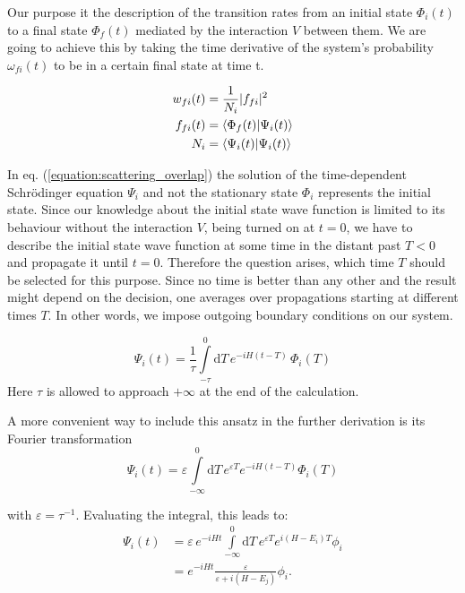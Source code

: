 Our purpose it the description of the transition rates from an initial state
$\Phi_i(t)$ to a final state $\Phi_f(t)$ mediated by the interaction $V$ between
them. We are going to achieve this by taking the time derivative of the system's
probability $\omega_{fi}(t)$ to be in a certain final state at time t.

\begin{align}
  w_{fi}(t) &= \frac 1{N_i} |f_{fi}|^2 \\
  f_{fi}(t) &= \braket{\Phi_f(t)|\Psi_i(t)} \label{equation:scattering_overlap}\\
  N_i       &= \braket{\Psi_i(t)|\Psi_i(t)}
\end{align}

In eq. (\ref{equation:scattering_overlap}) the solution of the time-dependent 
Schrödinger equation $\Psi_i$ and not the stationary state $\Phi_i$
represents the initial state. Since our knowledge
about the initial state wave function is limited to its behaviour without the
interaction $V$, being turned on at $t=0$, we have to describe the initial state
wave function at some time in the distant past $T<0$ and propagate it until $t=0$.
Therefore the question arises, which time $T$ should be selected for this purpose.
Since no time is better than any other and the result might depend on the decision,
one averages over propagations starting at different times $T$. In other words,
we impose outgoing boundary conditions on our system.

\begin{equation}
  \Psi_i(t) = \frac 1\tau \int\limits_{-\tau}^0 \mathrm{d}T \,
              e^{-iH(t-T)} \, \Phi_i(T)
\end{equation}
Here $\tau$ is allowed to approach $+\infty$ at the end of the calculation.

A more convenient way to include this ansatz in the further derivation
is its Fourier transformation
\begin{equation}
  \Psi_i(t) = \varepsilon \int\limits_{-\infty}^0 \mathrm{d}T \,
              e^{\varepsilon T} e^{-iH(t-T)} \Phi_i(T)
\end{equation}

with $\varepsilon = \tau^{-1}$. Evaluating the integral, this leads to:
\begin{align}
   \Psi_i(t) &= \varepsilon \, e^{-iHt} \int\limits_{-\infty}^0 \mathrm{d}T \,
                e^{\varepsilon T} e^{i(H-E_i)T} \phi_i\\
             &= e^{-iHt} \frac{\varepsilon}{\varepsilon+i(H-E_j)} \phi_i .
\end{align}


